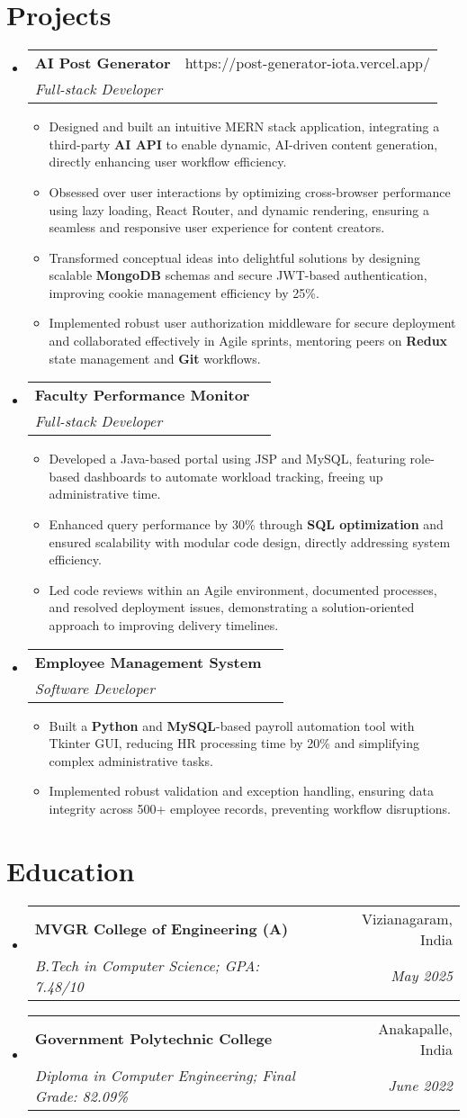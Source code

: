 \documentclass[article,11pt]{article}
\makeatletter
\newcommand{\resumeSubheading}[4]{
\item
    \begin{tabular*}{0.97\textwidth}[t]{l@{\extracolsep{\fill}}r}
    \textbf{#1} & #2 \\
    \textit{\small#3} & \textit{\small #4}
    \end{tabular*}
}
\newcommand{\resumeItem}[1]{\item\small{#1}}
\newcommand{\resumeSubHeadingListStart}{\begin{itemize}[leftmargin=0.15in, label={}]}
\newcommand{\resumeSubHeadingListEnd}{\end{itemize}}
\newcommand{\resumeItemListStart}{\begin{itemize}[leftmargin=0.15in, label=\textbullet]}
\newcommand{\resumeItemListEnd}{\end{itemize}}
\makeatother
\begin{document}
\section{Projects}
\resumeSubHeadingListStart

\resumeSubheading
{AI Post Generator}{https://post-generator-iota.vercel.app/}
{Full-stack Developer}
{}
\resumeItemListStart
\resumeItem{Designed and built an intuitive MERN stack application, integrating a third-party \textbf{AI API} to enable dynamic, AI-driven content generation, directly enhancing user workflow efficiency.}
\resumeItem{Obsessed over user interactions by optimizing cross-browser performance using lazy loading, React Router, and dynamic rendering, ensuring a seamless and responsive user experience for content creators.}
\resumeItem{Transformed conceptual ideas into delightful solutions by designing scalable \textbf{MongoDB} schemas and secure JWT-based authentication, improving cookie management efficiency by 25\%.}
\resumeItem{Implemented robust user authorization middleware for secure deployment and collaborated effectively in Agile sprints, mentoring peers on \textbf{Redux} state management and \textbf{Git} workflows.}
\resumeItemListEnd

\resumeSubheading
{Faculty Performance Monitor}{}
{Full-stack Developer}
{}
\resumeItemListStart
\resumeItem{Developed a Java-based portal using JSP and MySQL, featuring role-based dashboards to automate workload tracking, freeing up administrative time.}
\resumeItem{Enhanced query performance by 30\% through \textbf{SQL optimization} and ensured scalability with modular code design, directly addressing system efficiency.}
\resumeItem{Led code reviews within an Agile environment, documented processes, and resolved deployment issues, demonstrating a solution-oriented approach to improving delivery timelines.}
\resumeItemListEnd

\resumeSubheading
{Employee Management System}{}
{Software Developer}
{}
\resumeItemListStart
\resumeItem{Built a \textbf{Python} and \textbf{MySQL}-based payroll automation tool with Tkinter GUI, reducing HR processing time by 20\% and simplifying complex administrative tasks.}
\resumeItem{Implemented robust validation and exception handling, ensuring data integrity across 500+ employee records, preventing workflow disruptions.}
\resumeItemListEnd

\resumeSubHeadingListEnd

\section{Education}
\resumeSubHeadingListStart
\resumeSubheading
{MVGR College of Engineering (A)}{Vizianagaram, India}
{B.Tech in Computer Science; GPA: 7.48/10}{May 2025}
\resumeSubheading
{Government Polytechnic College}{Anakapalle, India}
{Diploma in Computer Engineering; Final Grade: 82.09\%}{June 2022}
\resumeSubHeadingListEnd
\end{document}
